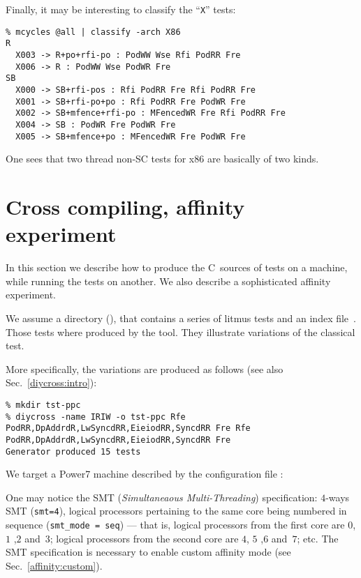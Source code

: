 Finally, it may be interesting to classify the ``\texttt{X}'' tests:
\begin{verbatim}
% mcycles @all | classify -arch X86
R
  X003 -> R+po+rfi-po : PodWW Wse Rfi PodRR Fre
  X006 -> R : PodWW Wse PodWR Fre
SB
  X000 -> SB+rfi-pos : Rfi PodRR Fre Rfi PodRR Fre
  X001 -> SB+rfi-po+po : Rfi PodRR Fre PodWR Fre
  X002 -> SB+mfence+rfi-po : MFencedWR Fre Rfi PodRR Fre
  X004 -> SB : PodWR Fre PodWR Fre
  X005 -> SB+mfence+po : MFencedWR Fre PodWR Fre
\end{verbatim}
One sees that two thread non-SC tests for x86 are basically of two kinds.




\section{Cross compiling, \label{affinity:experiment}affinity experiment}
In this section we describe how to produce the C~sources of tests
on a machine, while running the tests on another.
We also describe a sophisticated affinity experiment.

We assume a directory %
\ifhevea{} ()\fi,
that contains a series of litmus tests
and an index file~.
Those tests where produced by the 
tool. They illustrate variations of the
classical  test.
\ifhevea\begin{center}\end{center}\fi
More specifically, the  variations are produced as follows
(see also Sec.~\ref{diycross:intro}):
\begin{verbatim}
% mkdir tst-ppc
% diycross -name IRIW -o tst-ppc Rfe PodRR,DpAddrdR,LwSyncdRR,EieiodRR,SyncdRR Fre Rfe PodRR,DpAddrdR,LwSyncdRR,EieiodRR,SyncdRR Fre
Generator produced 15 tests
\end{verbatim}


We target a Power7 machine described by the configuration file
:

One may notice the SMT (\emph{Simultaneaous Multi-Threading}) specification:
$4$-ways SMT (\verb+smt=4+), logical processors pertaining
to the same core being numbered in sequence (\verb+smt_mode = seq+) ---
that is, logical processors from the first core are $0$, $1$ ,$2$ and~$3$;
logical processors from the second core are $4$, $5$ ,$6$ and~$7$; etc.
The SMT specification is necessary to enable
custom affinity mode
(see Sec.~\ref{affinity:custom}).

